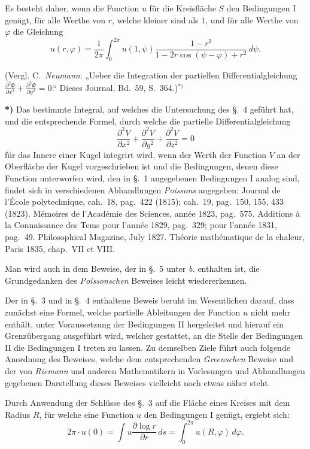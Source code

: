 \documentclass{article}
\begin{document}
Es besteht daher, wenn die Function $u$ für die Kreisfläche $S$ den Bedingungen I genügt, für alle Werthe von $r$, welche kleiner sind als $1$, und für alle Werthe von $\varphi$ die Gleichung
\[
u(r, \varphi) = \frac{1}{2\pi} \int_0^{2\pi} u(1, \psi) \frac{1 - r^2}{1 - 2r \cos(\psi - \varphi) + r^2}\,d\psi.
\]

(Vergl. C.~\emph{Neumann}: „Ueber die Integration der partiellen Differentialgleichung $\frac{\partial^2 \varPhi}{\partial x^2} + \frac{\partial^2 \varPhi}{\partial y^2} = 0$.`` Dieses Journal, Bd.~59, S.~364.)${}^{*)}$

\textbf{*)} Das bestimmte Integral, auf welches die Untersuchung des §.~4 geführt hat, und die entsprechende Formel, durch welche die partielle Differentialgleichung
\[
\frac{\partial^2 V}{\partial x^2} + \frac{\partial^2 V}{\partial y^2} + \frac{\partial^2 V}{\partial z^2} = 0
\]
für das Innere einer Kugel integrirt wird, wenn der Werth der Function $V$ an der Oberfläche der Kugel vorgeschrieben ist und die Bedingungen, denen diese Function unterworfen wird, den in §.~1 angegebenen Bedingungen I analog sind, findet sich in verschiedenen Abhandlungen \emph{Poissons} angegeben: Journal de l'École polytechnique, cah.~18, pag.~422 (1815); cah.~19, pag.~150, 155, 433 (1823). Mémoires de l'Académie des Sciences, année 1823, pag.~575. Additions à la Connaissance des Tems pour l'année 1829, pag.~329; pour l'année 1831, pag.~49. Philosophical Magazine, July 1827. Théorie mathématique de la chaleur, Paris 1835, chap.~VII et VIII.

Man wird auch in dem Beweise, der in §.~5 unter \emph{b.} enthalten ist, die Grundgedanken des \emph{Poissonschen} Beweises leicht wiedererkennen.

Der in §.~3 und in §.~4 enthaltene Beweis beruht im Wesentlichen darauf, dass zunächst eine Formel, welche partielle Ableitungen der Function $u$ nicht mehr enthält, unter Voraussetzung der Bedingungen II hergeleitet und hierauf ein Grenzübergang ausgeführt wird, welcher gestattet, an die Stelle der Bedingungen II die Bedingungen I treten zu lassen. Zu demselben Ziele führt auch folgende Anordnung des Beweises, welche dem entsprechenden \emph{Greenschen} Beweise und der von \emph{Riemann} und anderen Mathematikern in Vorlesungen und Abhandlungen gegebenen Darstellung dieses Beweises vielleicht noch etwas näher steht.

Durch Anwendung der Schlüsse des §.~3 auf die Fläche eines Kreises mit dem Radius $R$, für welche eine Function $u$ den Bedingungen I genügt, ergiebt sich:
\[
\tag{I.} 2\pi \cdot u(0) = \int u \frac{\partial\log r}{\partial r}\,ds = \int_0^{2\pi} u(R, \varphi)\,d\varphi.
\]
\end{document}
